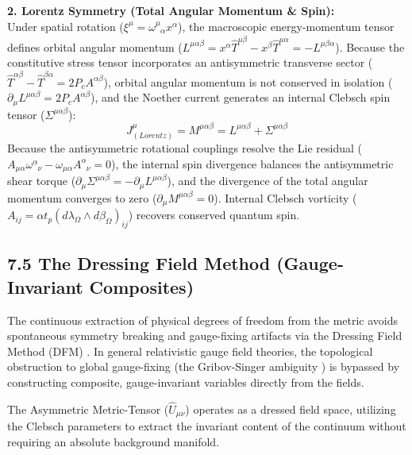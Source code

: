 \textbf{2. Lorentz Symmetry (Total Angular Momentum \& Spin):} \\
Under spatial rotation ($\xi^\mu = \omega^\mu_{\phantom{\mu}\alpha} x^\alpha$), the macroscopic energy-momentum tensor defines orbital angular momentum ($L^{\mu\alpha\beta} = x^\alpha \hat{T}^{\mu\beta} - x^\beta \hat{T}^{\mu\alpha} = -L^{\mu\beta\alpha}$). Because the constitutive stress tensor incorporates an antisymmetric transverse sector ($\hat{T}^{\alpha\beta} - \hat{T}^{\beta\alpha} = 2 P_c A^{\alpha\beta}$), orbital angular momentum is not conserved in isolation ($\partial_\mu L^{\mu\alpha\beta} = 2 P_c A^{\alpha\beta}$), and the Noether current generates an internal Clebsch spin tensor ($\Sigma^{\mu\alpha\beta}$):
\begin{equation}
    J^\mu_{(Lorentz)} = M^{\mu\alpha\beta} = L^{\mu\alpha\beta} + \Sigma^{\mu\alpha\beta}  %
\end{equation}
Because the antisymmetric rotational couplings resolve the Lie residual ($A_{\mu\alpha}\omega^\alpha_{\phantom{\alpha}\nu} - \omega_{\mu\alpha}A^\alpha_{\phantom{\alpha}\nu} = 0$), the internal spin divergence balances the antisymmetric shear torque ($\partial_\mu \Sigma^{\mu\alpha\beta} = -\partial_\mu L^{\mu\alpha\beta}$), and the divergence of the total angular momentum converges to zero ($\partial_\mu M^{\mu\alpha\beta} = 0$). 
Internal Clebsch vorticity ($A_{ij} = \alpha t_p (d\lambda_\Omega \wedge d\beta_\Omega)_{ij}$) recovers conserved quantum spin.



\subsection*{7.5 The Dressing Field Method (Gauge-Invariant Composites)} 
\label{sec:dressing_field_method}

The continuous extraction of physical degrees of freedom from the metric avoids spontaneous symmetry breaking and gauge-fixing artifacts via the Dressing Field Method (DFM) \cite{Francois2024}. In general relativistic gauge field theories, the topological obstruction to global gauge-fixing (the Gribov-Singer ambiguity \cite{Gribov1978, Singer1978}) is bypassed by constructing composite, gauge-invariant variables directly from the fields.

The Asymmetric Metric-Tensor ($\hat{U}_{\mu\nu}$) operates as a dressed field space, utilizing the Clebsch parameters to extract the invariant content of the continuum without requiring an absolute background manifold. 


